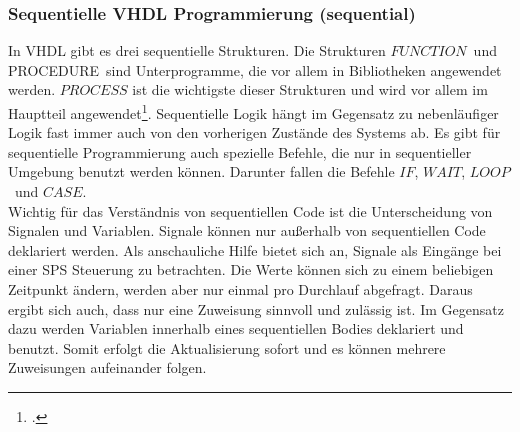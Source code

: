 \documentclass[12pt,a4paper]{scrartcl}	%
\begin{document}
\subsubsection{Sequentielle VHDL Programmierung (sequential)}
In VHDL gibt es drei sequentielle Strukturen. Die Strukturen $FUNCTION$~und \glqq PROCEDURE\grqq~sind Unterprogramme, die vor allem in Bibliotheken angewendet werden. $PROCESS$ ist die wichtigste dieser Strukturen und wird vor allem im Hauptteil angewendet\footcite[vgl.][S. 75f.]{VHDL}.
Sequentielle Logik hängt im Gegensatz zu nebenläufiger Logik fast immer auch von den vorherigen Zustände des Systems ab. Es gibt für sequentielle Programmierung auch spezielle Befehle, die nur in sequentieller Umgebung benutzt werden können. 
Darunter fallen die Befehle $IF$, $WAIT$, $LOOP$~und $CASE$.\\
Wichtig für das Verständnis von sequentiellen Code ist die Unterscheidung von Signalen und Variablen. Signale können nur außerhalb von sequentiellen Code deklariert werden. Als anschauliche Hilfe bietet sich an, Signale als Eingänge bei einer SPS Steuerung zu betrachten. Die Werte können sich zu einem beliebigen Zeitpunkt ändern, werden aber nur einmal pro Durchlauf abgefragt. Daraus ergibt sich auch, dass nur eine Zuweisung sinnvoll und zulässig ist. Im Gegensatz dazu werden Variablen innerhalb eines sequentiellen Bodies deklariert und benutzt. Somit erfolgt die Aktualisierung sofort und es können mehrere Zuweisungen aufeinander folgen. 
\end{document}
